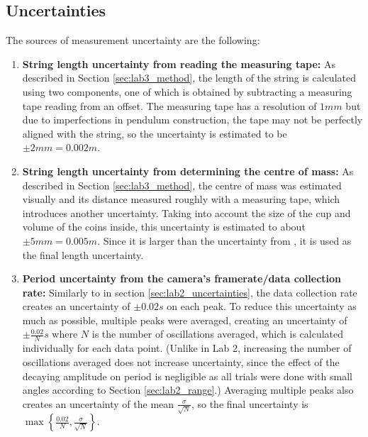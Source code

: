 \documentclass[aps,twocolumn,secnumarabic,nobalancelastpage,amsmath,amssymb,nofootinbib,floatfix,letterpaper]{revtex4}
\begin{document}
\subsection{Uncertainties}

The sources of measurement uncertainty are the following:
\begin{enumerate}
    \item
        \textbf{String length uncertainty from reading the measuring tape:} As described in Section \ref{sec:lab3_method},
        the length of the string is calculated using two components, one of which is obtained by subtracting a measuring
        tape reading from an offset. The measuring tape has a resolution of \(1\si{mm}\) but due to imperfections in
        pendulum construction, the tape may not be perfectly aligned with the string, so the uncertainty is estimated to be
        \(\pm 2\si{mm} = 0.002\si{m}\).
    \item
        \textbf{String length uncertainty from determining the centre of mass:} As described in Section
        \ref{sec:lab3_method}, the centre of mass was estimated visually and its distance measured roughly with a
        measuring tape, which introduces another uncertainty. Taking into account the size of the cup and volume of the
        coins inside, this uncertainty is estimated to about \(\pm 5\si{mm} = 0.005\si{m}\). Since it is larger than the
        uncertainty from , it is used as the final length uncertainty.
    \item
        \textbf{Period uncertainty from the camera's framerate/data collection rate:} Similarly to  in
        section \ref{sec:lab2_uncertainties}, the data collection rate creates an uncertainty of \(\pm 0.02\si{s}\) on
        each peak. To reduce this uncertainty as much as possible, multiple peaks were averaged, creating an uncertainty
        of \(\pm \frac{0.02}{N}\si{s}\) where \(N\) is the number of oscillations averaged, which is calculated
        individually for each data point. (Unlike in Lab 2, increasing the number of oscillations averaged does not
        increase uncertainty, since the effect of the decaying amplitude on period is negligible as all trials were done
        with small angles according to Section \ref{sec:lab2_range}.) Averaging multiple peaks also creates an
        uncertainty of the mean \(\frac{\sigma}{\sqrt{N}}\), so the final uncertainty is
        \(\max\left\{\frac{0.02}{N}, \frac{\sigma}{\sqrt{N}}\right\}\).
\end{enumerate}
\end{document}
